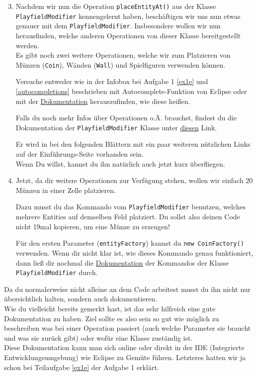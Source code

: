\begin{enumerate}
	\setcounter{enumi}{2}
    \item Nachdem wir nun die Operation \lstinline{placeEntityAt()} aus der Klasse \lstinline{PlayfieldModifier} kennengelernt haben, beschäftigen wir uns nun etwas genauer mit dem \lstinline{PlayfieldModifier}.
    Insbesondere wollen wir nun herausfinden, welche anderen Operationen von dieser Klasse bereitgestellt werden.\\
    Es gibt noch zwei weitere Operationen, welche wir zum Platzieren von Münzen (\lstinline{Coin}), Wänden (\lstinline{Wall}) und Spielfiguren verwenden können.

    Versuche entweder wie in der Infobox bei Aufgabe 1 \ref{ex1e} und \ref{autocompletions} beschrieben mit Autocomplete-Funktion von Eclipse oder mit der \href{\javadocRoot}{Dokumentation} herauszufinden, wie diese heißen.

    Falls du noch mehr Infos über Operationen o.Ä. brauchst, findest du die Dokumentation der \newline \lstinline{PlayfieldModifier} Klasse unter \href{\javadocRoot\PlayFieldModifierDocLinkSuffix}{diesen} Link.

    Er wird in bei den folgenden Blättern mit ein paar weiteren nützlichen Links auf der Einführungs-Seite vorhanden sein.\\
	Wenn Du willst, kannst du ihn natürlich auch jetzt kurz überfliegen.

    \item Jetzt, da dir weitere Operationen zur Verfügung stehen, wollen wir einfach 20 Münzen in einer Zelle platzieren.

    Dazu musst du das Kommando vom \lstinline{PlayfieldModifier} benutzen, welches mehrere Entities auf demselben Feld platziert. Du sollst also deinen Code nicht 19mal kopieren, um eine Münze zu erzeugen!

    Für den ersten Parameter (\lstinline{entityFactory}) kannst du \lstinline{new CoinFactory()} verwenden.
    Wenn dir nicht klar ist, wie dieses Kommando genau funktioniert, dann ließ dir nochmal die \href{\javadocRoot\PlayFieldModifierDocLinkSuffix}{Dokumentation} der Kommandos der Klasse \lstinline{PlayfieldModifier} durch.
\end{enumerate}

\begin{Infobox}
    Da du normalerweise nicht alleine an dem Code arbeitest musst du ihn nicht nur übersichtlich halten, sondern auch dokumentieren.\\
    Wie du vielleicht bereits gemerkt hast, ist das sehr hilfreich eine gute Dokumentation zu haben.
    Ziel sollte es also sein so gut wie möglich zu beschreiben was bei einer Operation passiert (auch welche Parameter sie braucht und was sie zurück gibt) oder wofür eine Klasse zuständig ist.\\

    Diese Dokumentation kann man sich online oder direkt in der IDE (Integrierte Entwicklungsumgebung) wie Eclipse zu Gemüte führen. Letzteres hatten wir ja schon bei Teilaufgabe \ref{ex1e} der Aufgabe 1 erklärt.
\end{Infobox}


